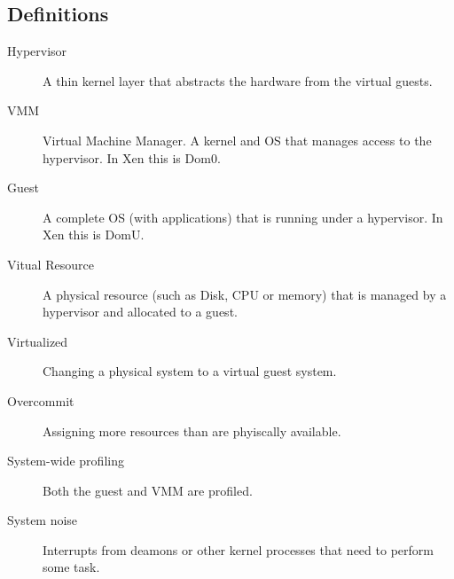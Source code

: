 \subsection{Definitions}
\begin{description}
  \item[Hypervisor] A thin kernel layer that abstracts the hardware from the virtual guests.\\
  \item[VMM] Virtual Machine Manager. A kernel and OS that manages access to the hypervisor.  In Xen this is Dom0.\\
  \item[Guest] A complete OS (with applications) that is running under a hypervisor.  In Xen this is DomU.\\
  \item[Vitual Resource]  A physical resource (such as Disk, CPU or memory) that is managed by a hypervisor and allocated to a guest.\\
  \item[Virtualized] Changing a physical system to a virtual guest system.\\
  \item[Overcommit] Assigning more resources than are phyiscally available.\\
  \item[System-wide profiling] Both the guest and VMM are profiled.\\
  \item[System noise] Interrupts from deamons or other kernel processes that need to perform some task. \cite{tsafrir}\\
\end{description}
